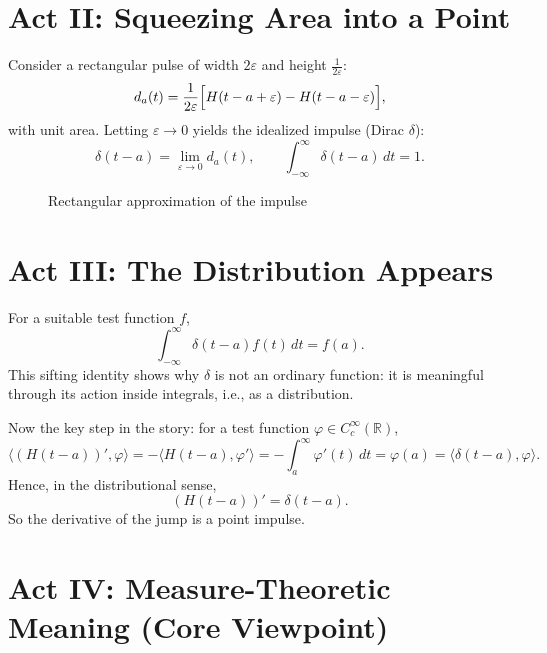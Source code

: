 \documentclass[12pt]{article}
\begin{document}
\section{Act II: Squeezing Area into a Point}

Consider a rectangular pulse of width $2\varepsilon$ and height $\frac{1}{2\varepsilon}$:
\[
 d_a(t)=\frac{1}{2\varepsilon}\Bigl[H(t-a+\varepsilon)-H(t-a-\varepsilon)\Bigr],
\]
with unit area. Letting $\varepsilon\to 0$ yields the idealized impulse (Dirac $\delta$):
\[
 \delta(t-a)=\lim_{\varepsilon\to 0} d_a(t),
 \qquad
 \int_{-\infty}^{\infty}\delta(t-a)\,dt=1.
\]

\begin{figure}[h]
  \centering
  \caption{Rectangular approximation of the impulse}
\end{figure}

\section{Act III: The Distribution Appears}

For a suitable test function $f$,
\[
 \int_{-\infty}^{\infty} \delta(t-a) f(t)\,dt = f(a).
\]
This sifting identity shows why $\delta$ is not an ordinary function:
it is meaningful through its action inside integrals, i.e., as a distribution.

Now the key step in the story:
for a test function $\varphi\in C_c^\infty(\mathbb{R})$,
\[
 \langle (H(t-a))',\varphi\rangle
 =-\langle H(t-a),\varphi'\rangle
 =-\int_a^\infty \varphi'(t)\,dt
 =\varphi(a)
 =\langle \delta(t-a),\varphi\rangle.
\]
Hence, in the distributional sense,
\[
 (H(t-a))'=\delta(t-a).
\]
So the derivative of the jump is a point impulse.

\section{Act IV: Measure-Theoretic Meaning (Core Viewpoint)}
\end{document}
